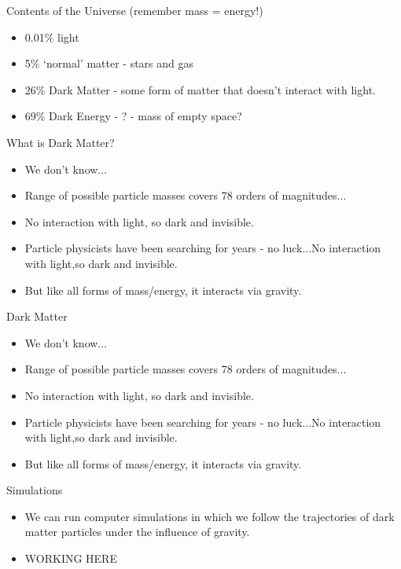 \documentclass[usenames,dvipsnames]{beamer}
\begin{document}
\begin{frame}{Contents of the Universe (remember mass = energy!)}
  \begin{block}{}
    \begin{itemize}
      \item{0.01\% light}
      \item{5\% `normal' matter - stars and gas}
      \item{26\% Dark Matter - some form of matter that doesn't interact with light.}
      \item{69\% Dark Energy - ? - mass of empty space?}
    \end{itemize}
  \end{block}
\end{frame}

\begin{frame}{What is Dark Matter?}
  \begin{block}{}
    \begin{itemize}
      \item{We don't know...}
      \item{Range of possible particle masses covers 78 orders of magnitudes...}
      \item{No interaction with light, so dark and invisible.}
      \item{Particle physicists have been searching for years - no luck...No interaction with light,so dark and invisible.}
      \item{But like all forms of mass/energy, it interacts via gravity.}
    \end{itemize}
  \end{block}
\end{frame}

\begin{frame}{Dark Matter}
  \begin{block}{}
    \begin{itemize}
      \item{We don't know...}
      \item{Range of possible particle masses covers 78 orders of magnitudes...}
      \item{No interaction with light, so dark and invisible.}
      \item{Particle physicists have been searching for years - no luck...No interaction with light,so dark and invisible.}
      \item{But like all forms of mass/energy, it interacts via gravity.}
    \end{itemize}
  \end{block}
\end{frame}

\begin{frame}{Simulations}
  \begin{block}{}
    \begin{itemize}
      \item{We can run computer simulations in which we follow the trajectories of dark matter particles under the influence of gravity.}
      \item{WORKING HERE}
    \end{itemize}
  \end{block}
\end{frame}
\end{document}
